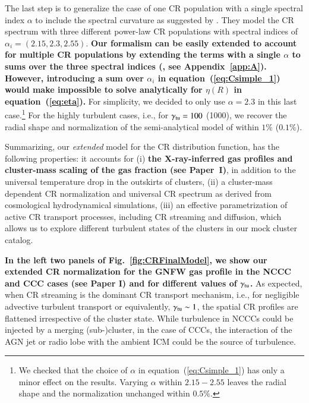 \documentclass[useAMS,usenatbib]{mn2e}
\begin{document}
The last step is to generalize the case of one CR population with a single
spectral index $\alpha$ to include the spectral curvature as suggested by
\cite{2010MNRAS.409..449P}. They model the CR spectrum with three different
power-law CR populations with spectral indices of
$\alpha_{i}=(2.15,2.3,2.55)$. {\bf Our formalism can be easily extended to account
for multiple CR populations by extending the terms with a single $\alpha$ to
sums over the three spectral indices (\citealp{2010MNRAS.409..449P}, see
Appendix~\ref{app:A}). 
However, introducing a sum over $\alpha_{i}$ in
equation~(\ref{eq:Csimple_1}) would make impossible to solve analytically for
$\eta(R)$ in equation~(\ref{eq:eta}).} For simplicity, we decided to only use
$\alpha = 2.3$ in this last case.\footnote{We checked that the choice of
  $\alpha$ in equation~(\ref{eq:Csimple_1}) has only a minor effect on the
  results. Varying $\alpha$ within $2.15-2.55$ leaves the radial shape and the
  normalization unchanged within $0.5\%$.} For the highly turbulent cases, i.e.,
for $\gamma_{{\mathrm{tu}}}=100$ (1000), we recover the radial shape and
normalization of the semi-analytical model of \cite{2010MNRAS.409..449P} within
$1\%$ ($0.1\%$).

Summarizing, our \emph{extended} model for the CR distribution function, has the
following properties: it accounts for (i) {\bf the X-ray-inferred gas
profiles and cluster-mass scaling of the gas fraction (see Paper~I)}, in addition to the
universal temperature drop in the outskirts of clusters, (ii) a cluster-mass
dependent CR normalization and universal CR spectrum as derived from
cosmological hydrodynamical simulations, (iii) an effective parametrization of
active CR transport processes, including CR streaming and diffusion, which
allows us to explore different turbulent states of the clusters in our mock
cluster catalog.

{\bf In the left two panels of Fig.~\ref{fig:CRFinalModel}, we show our extended CR 
normalization for the GNFW gas profile in the NCCC and CCC cases (see Paper I) 
and for different values of $\gamma_{{\mathrm{tu}}}$.}  
As expected, when CR streaming is the dominant CR
transport mechanism, i.e., for negligible advective turbulent transport or
equivalently, $\gamma_{{\mathrm{tu}}}\sim1$, the spatial CR profiles are flattened
irrespective of the cluster state. While turbulence in NCCCs could be
injected by a merging (sub-)cluster, in the case of CCCs, the interaction of the
AGN jet or radio lobe with the ambient ICM could be the source of turbulence.
\end{document}
